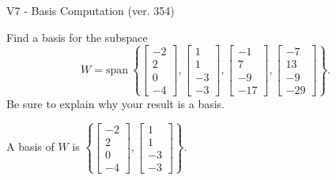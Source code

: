 \begin{exercise}
  \begin{exerciseTitle}V7 - Basis Computation (ver. 354)\end{exerciseTitle}
  \begin{exerciseStatement}
    Find a basis for the subspace 
\[W=\mathrm{span}\ \left\{\left[\begin{array}{r}
-2 \\
2 \\
0 \\
-4
\end{array}\right] , \left[\begin{array}{r}
1 \\
1 \\
-3 \\
-3
\end{array}\right] , \left[\begin{array}{r}
-1 \\
7 \\
-9 \\
-17
\end{array}\right] , \left[\begin{array}{r}
-7 \\
13 \\
-9 \\
-29
\end{array}\right]\right\}.\]
 Be sure to explain why your result is a basis.


  \end{exerciseStatement}
  \begin{exerciseAnswer}
   A basis of \(W\) is  \(\left\{\left[\begin{array}{r}
-2 \\
2 \\
0 \\
-4
\end{array}\right] , \left[\begin{array}{r}
1 \\
1 \\
-3 \\
-3
\end{array}\right]\right\}\).
  


  \end{exerciseAnswer}
\end{exercise}